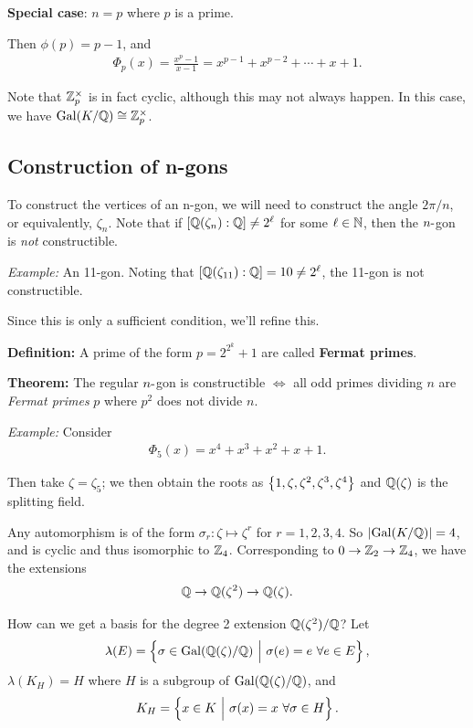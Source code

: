 \textbf{Special case}: \(n=p\) where \(p\) is a prime.

Then \(\phi(p) = p-1\), and
\begin{align*}
\Phi_p(x) = \frac{x^p - 1}{x-1} = x^{p-1} + x^{p-2} + \cdots + x + 1
.\end{align*}

Note that \({\mathbb{Z}}_p^{\times}\) is in fact cyclic, although this may not
always happen. In this case, we have \(\mathrm{Gal}(K/{\mathbb{Q}}) \cong {\mathbb{Z}}_p^{\times}\).

\hypertarget{construction-of-n-gons}{%
\subsection{Construction of n-gons}\label{construction-of-n-gons}}

To construct the vertices of an n-gon, we will need to construct the
angle \(2\pi/n\), or equivalently, \(\zeta_n\). Note that if
\([{\mathbb{Q}}(\zeta_n) : {\mathbb{Q}}] \neq 2^\ell\) for some \(\ell\in{\mathbb{N}}\), then the
\(n{\hbox{-}}\)gon is \emph{not} constructible.

\emph{Example:} An 11-gon. Noting that
\([{\mathbb{Q}}(\zeta_{11}) : {\mathbb{Q}}] = 10 \neq 2^\ell\), the 11-gon is not
constructible.

Since this is only a sufficient condition, we'll refine this.

\textbf{Definition:} A prime of the form \(p = 2^{2^k}+1\) are called
\textbf{Fermat primes}.

\textbf{Theorem:} The regular \(n{\hbox{-}}\)gon is constructible \(\iff\)
all odd primes dividing \(n\) are \emph{Fermat primes} \(p\) where
\(p^2\) does not divide \(n\).

\emph{Example:} Consider
\begin{align*}
\Phi_5(x) = x^4 + x^3 + x^2 + x + 1
.\end{align*}

Then take \(\zeta = \zeta_5\); we then obtain the roots as
\(\left\{{1, \zeta, \zeta^2, \zeta^3, \zeta^4}\right\}\) and \({\mathbb{Q}}(\zeta)\) is
the splitting field.

Any automorphism is of the form \(\sigma_r: \zeta \mapsto \zeta^r\) for
\(r=1,2,3,4\). So \({\left\lvert {\mathrm{Gal}(K/{\mathbb{Q}})} \right\rvert} = 4\), and is cyclic and thus
isomorphic to \({\mathbb{Z}}_4\). Corresponding to \(0 \to {\mathbb{Z}}_2 \to {\mathbb{Z}}_4\), we
have the extensions
\begin{align*}
{\mathbb{Q}} \to {\mathbb{Q}}(\zeta^2) \to {\mathbb{Q}}(\zeta)
.\end{align*}

How can we get a basis for the degree 2 extension \({\mathbb{Q}}(\zeta^2)/{\mathbb{Q}}\)?
Let
\begin{align*}
\lambda(E) = \left\{{\sigma \in \mathrm{Gal}({\mathbb{Q}}(\zeta)/{\mathbb{Q}}) {~\mathrel{\Big|}~} \sigma(e) = e ~\forall e\in E }\right\}
,\end{align*} \(\lambda(K_H) = H\) where \(H\) is a subgroup of
\(\mathrm{Gal}({\mathbb{Q}}(\zeta)/{\mathbb{Q}})\), and
\begin{align*}
K_H = \left\{{x\in K {~\mathrel{\Big|}~} \sigma(x) = x ~\forall \sigma\in H}\right\}
.\end{align*}

